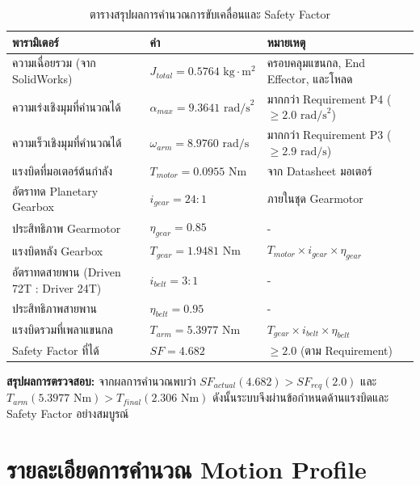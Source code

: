 \begin{table}[H]
    \centering
    \caption{ตารางสรุปผลการคำนวณการขับเคลื่อนและ Safety Factor}
    \label{tab:motor_calc_summary}
    \begin{tabular}{|p{}|p{}|p{}|}
        \hline
        \textbf{พารามิเตอร์} & \textbf{ค่า} & \textbf{หมายเหตุ} \\
        \hline
        ความเฉื่อยรวม (จาก SolidWorks) & $J_{total} = 0.5764 \text{ kg}\cdot\text{m}^2$ & ครอบคลุมแขนกล, End Effector, และโหลด \\
        \hline
        ความเร่งเชิงมุมที่คำนวณได้ & $\alpha_{max} = 9.3641 \text{ rad/s}^2$ & มากกว่า Requirement P4 ($\geq 2.0 \text{ rad/s}^2$) \\
        \hline
        ความเร็วเชิงมุมที่คำนวณได้ & $\omega_{arm} = 8.9760 \text{ rad/s}$ & มากกว่า Requirement P3 ($\geq 2.9 \text{ rad/s}$) \\
        \hline
        แรงบิดที่มอเตอร์ต้นกำลัง & $T_{motor} = 0.0955 \text{ Nm}$ & จาก Datasheet มอเตอร์ \\
        \hline
        อัตราทด Planetary Gearbox & $i_{gear} = 24:1$ & ภายในชุด Gearmotor \\
        \hline
        ประสิทธิภาพ Gearmotor & $\eta_{gear} = 0.85$ & - \\
        \hline
        แรงบิดหลัง Gearbox & $T_{gear} = 1.9481 \text{ Nm}$ & $T_{motor} \times i_{gear} \times \eta_{gear}$ \\
        \hline
        อัตราทดสายพาน (Driven 72T : Driver 24T) & $i_{belt} = 3:1$ & - \\
        \hline
        ประสิทธิภาพสายพาน & $\eta_{belt} = 0.95$ & - \\
        \hline
        แรงบิดรวมที่เพลาแขนกล & $T_{arm} = 5.3977 \text{ Nm}$ & $T_{gear} \times i_{belt} \times \eta_{belt}$ \\
        \hline
        Safety Factor ที่ได้ & $SF = 4.682$ & $\geq 2.0$ (ตาม Requirement) \\
        \hline
    \end{tabular}
\end{table}

\textbf{สรุปผลการตรวจสอบ:} 
จากผลการคำนวณพบว่า $SF_{actual} (4.682) > SF_{req} (2.0)$ และ $T_{arm} (5.3977 \text{ Nm}) > T_{final} (2.306 \text{ Nm})$ ดังนั้นระบบจึงผ่านข้อกำหนดด้านแรงบิดและ Safety Factor อย่างสมบูรณ์


\section{รายละเอียดการคำนวณ Motion Profile}
\label{sec:motion_profile_calculation_details}


